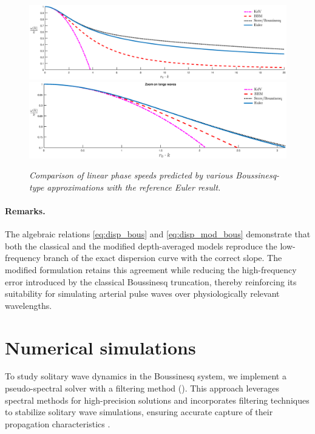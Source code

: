 \documentclass[alpha-refs, 12pt]{wiley-article}
\begin{document}
\begin{figure}[t]
  \centering
  \includegraphics[width=\textwidth]{figs/disp1.eps}
  \includegraphics[width=\textwidth]{figs/disp4.eps}
  \caption{\em Comparison of linear phase speeds predicted by various Boussinesq-type approximations with the reference Euler result.}
  \label{fig:disp}
\end{figure}

\paragraph{Remarks.} The algebraic relations \eqref{eq:disp_bous} and \eqref{eq:disp_mod_bous} demonstrate that both the classical and the modified depth-averaged models reproduce the low-frequency branch of the exact dispersion curve with the correct slope. The modified formulation retains this agreement while reducing the high-frequency error introduced by the classical Boussinesq truncation, thereby reinforcing its suitability for simulating arterial pulse waves over physiologically relevant wavelengths.

\section{Numerical simulations}\label{sec:numerics}

To study solitary wave dynamics in the Boussinesq system, we implement a pseudo-spectral solver with a filtering method (\cite{BonaCh}). This approach leverages spectral methods for high-precision solutions and incorporates filtering techniques to stabilize solitary wave simulations, ensuring accurate capture of their propagation characteristics \cite{Trefethen2000, Boyd2000}.
\end{document}

